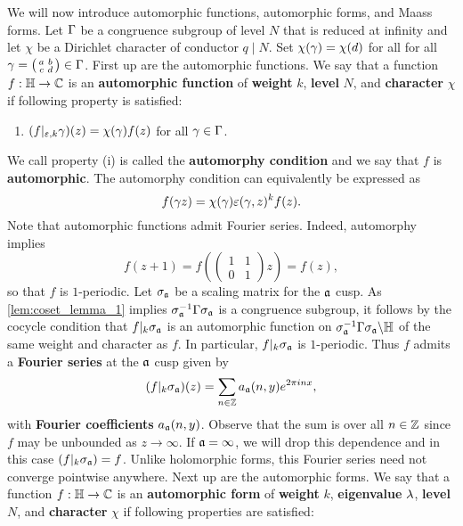     We will now introduce automorphic functions, automorphic forms, and Maass forms. Let $\Gamma$ be a congruence subgroup of level $N$ that is reduced at infinity and let $\chi$ be a Dirichlet character of conductor $q \mid N$. Set $\chi(\gamma) = \chi(d)$ for all for all $\gamma = \begin{psmallmatrix} a & b \\ c & d \end{psmallmatrix} \in \Gamma$. First up are the automorphic functions. We say that a function $f:\mathbb{H} \to \mathbb{C}$ is an \textbf{automorphic function} of \textbf{weight} $k$, \textbf{level} $N$, and \textbf{character} $\chi$ if following property is satisfied:
    \begin{enumerate}[label=(\roman*)]
      \item $(f|_{\varepsilon,k}\gamma)(z) = \chi(\gamma)f(z)$ for all $\gamma \in \Gamma$.
    \end{enumerate}
    We call property (i) is called the \textbf{automorphy condition} and we say that $f$ is \textbf{automorphic}. The automorphy condition can equivalently be expressed as
    \[
      f(\gamma z) = \chi(\gamma)\varepsilon(\gamma,z)^{k}f(z).
    \]
    Note that automorphic functions admit Fourier series. Indeed, automorphy implies
    \[
      f(z+1) = f\left(\begin{pmatrix} 1 & 1 \\ 0 & 1 \end{pmatrix}z\right) = f(z),
    \]
    so that $f$ is $1$-periodic. Let $\sigma_{\mathfrak{a}}$ be a scaling matrix for the $\mathfrak{a}$ cusp. As \cref{lem:coset_lemma_1} implies $\sigma_{\mathfrak{a}}^{-1}\Gamma\sigma_{\mathfrak{a}}$ is a congruence subgroup, it follows by the cocycle condition that $f|_{k}\sigma_{\mathfrak{a}}$ is an automorphic function on $\sigma_{\mathfrak{a}}^{-1}\Gamma\sigma_{\mathfrak{a}}\backslash\mathbb{H}$ of the same weight and character as $f$. In particular, $f|_{k}\sigma_{\mathfrak{a}}$ is $1$-periodic. Thus $f$ admits a \textbf{Fourier series} at the $\mathfrak{a}$ cusp given by
    \[
      (f|_{k}\sigma_{\mathfrak{a}})(z) = \sum_{n \in \mathbb{Z}}a_{\mathfrak{a}}(n,y)e^{2\pi inx},
    \]
    with \textbf{Fourier coefficients} $a_{\mathfrak{a}}(n,y)$. Observe that the sum is over all $n \in \mathbb{Z}$ since $f$ may be unbounded as $z \to \infty$. If $\mathfrak{a} = \infty$, we will drop this dependence and in this case $(f|_{k}\sigma_{\mathfrak{a}}) = f$. Unlike holomorphic forms, this Fourier series need not converge pointwise anywhere. Next up are the automorphic forms. We say that a function $f:\mathbb{H} \to \mathbb{C}$ is an \textbf{automorphic form} of \textbf{weight} $k$, \textbf{eigenvalue} $\lambda$, \textbf{level} $N$, and \textbf{character} $\chi$ if following properties are satisfied:
